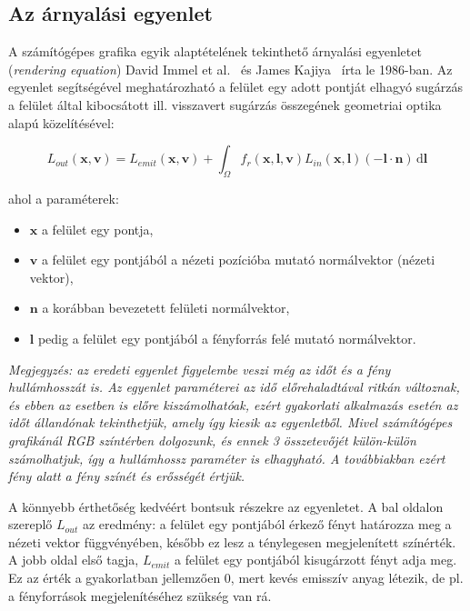 \subsection{Az árnyalási egyenlet}

A számítógépes grafika egyik alaptételének tekinthető árnyalási egyenletet (\textit{rendering equation}) David Immel et al.~\cite{immel1986radiosity} és James Kajiya~\cite{kajiya1986rendering} írta le 1986-ban. Az egyenlet segítségével meghatározható a felület egy adott pontját elhagyó sugárzás a felület által kibocsátott ill. visszavert sugárzás összegének geometriai optika alapú közelítésével:

\[
L_{out}(\mathbf{x},\mathbf{v}) = L_{emit}(\mathbf{x},\mathbf{v}) + \int_\Omega f_r(\mathbf{x},\mathbf{l},\mathbf{v}) L_{in}(\mathbf{x},\mathbf{l}) (-\mathbf{l} \cdot \mathbf{n})\,\mathrm{d}\mathbf{l}
\]

\noindent
ahol a paraméterek:

\begin{itemize}[noitemsep]
\item \(\mathbf{x}\) a felület egy pontja,
\item \(\mathbf{v}\) a felület egy pontjából a nézeti pozícióba mutató normálvektor (nézeti vektor),
\item \(\mathbf{n}\) a korábban bevezetett felületi normálvektor,
\item \(\mathbf{l}\) pedig a felület egy pontjából a fényforrás felé mutató normálvektor.
\end{itemize}

\noindent
\textit{Megjegyzés: az eredeti egyenlet figyelembe veszi még az időt és a fény hullámhosszát is. Az egyenlet paraméterei az idő előrehaladtával ritkán változnak, és ebben az esetben is előre kiszámolhatóak, ezért gyakorlati alkalmazás esetén az időt állandónak tekinthetjük, amely így kiesik az egyenletből. Mivel számítógépes grafikánál RGB színtérben dolgozunk, és ennek 3 összetevőjét külön-külön számolhatjuk, így a hullámhossz paraméter is elhagyható. A továbbiakban ezért fény alatt a fény színét és erősségét értjük.}

A könnyebb érthetőség kedvéért bontsuk részekre az egyenletet. A bal oldalon szereplő \(L_{out}\) az eredmény: a felület egy pontjából érkező fényt határozza meg a nézeti vektor függvényében, később ez lesz a ténylegesen megjelenített színérték. A jobb oldal első tagja, \(L_{emit}\) a felület egy pontjából kisugárzott fényt adja meg. Ez az érték a gyakorlatban jellemzően 0, mert kevés emisszív anyag létezik, de pl. a fényforrások megjelenítéséhez szükség van rá.

